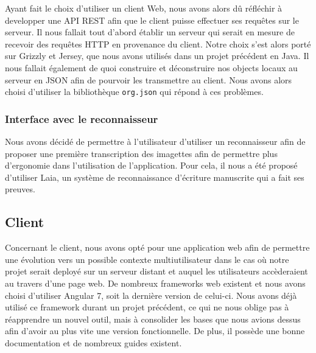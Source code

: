 Ayant fait le choix d'utiliser un client Web, nous avons alors dû réfléchir à developper une API REST afin que le client puisse effectuer ses requêtes sur le serveur. Il nous fallait tout d'abord établir un serveur qui serait en mesure de recevoir des requêtes HTTP en provenance du client. Notre choix s'est alors porté sur Grizzly et Jersey, que nous avons utilisés dans un projet précédent en Java. Il nous fallait également de quoi construire et déconstruire nos objects locaux au serveur en JSON afin de pourvoir les transmettre au client. Nous avons alors choisi d'utiliser la bibliothèque \texttt{org.json} qui répond à ces problèmes.

\subsubsection{Interface avec le reconnaisseur}

Nous avons décidé de permettre à l'utilisateur d'utiliser un reconnaisseur afin de proposer une première transcription des imagettes afin de permettre plus d'ergonomie dans l'utilisation de l'application. Pour cela, il nous a été proposé d'utiliser Laia, un système de reconnaissance d'écriture manuscrite qui a fait ses preuves.

\subsection{Client}

Concernant le client, nous avons opté pour une application web afin de permettre une évolution vers un possible contexte multiutilisateur dans le cas où notre projet serait deployé sur un serveur distant et auquel les utilisateurs accèderaient au travers d'une page web. De nombreux frameworks web existent et nous avons choisi d'utiliser Angular 7, soit la dernière version de celui-ci. Nous avons déjà utilisé ce framework durant un projet précédent, ce qui ne nous oblige pas à réapprendre un nouvel outil, mais à consolider les bases que nous avions dessus afin d'avoir au plus vite une version fonctionnelle. De plus, il possède une bonne documentation et de nombreux guides existent.